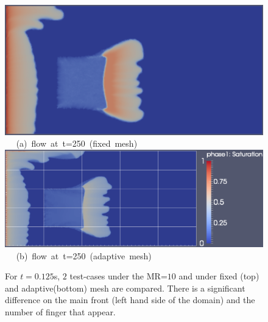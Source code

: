\begin{landscape}
\begin{figure}[ht] 
\vbox{
\hbox{\hspace{3.5cm}
\includegraphics[width=.65\textwidth]{./Pics1/mr10_5regions_fixed/5regions_fixed_250.pdf} 
}
\vspace{0.0cm}
\hbox{\hspace{6.5cm} (a) flow at t=250 (fixed mesh)  
}
\vspace{0.25cm}
\hbox{\hspace{3.5cm}
\includegraphics[width=.9\textwidth]{./Pics1/mr10_5regions_adapt/5regions_adapt_250_1.pdf}
}
\vspace{0.0cm}
\hbox{\hspace{6.5cm} (b) flow at t=250 (adaptive mesh)    
}
}     
\caption{For $t=0.125$s, $2$ test-cases under the MR=$10$ and under fixed (top) and adaptive(bottom) mesh are compared. There is a significant difference on the main front (left hand side of the domain) and the number of finger that appear.}
\label{fig:2testcase_a}
\end{figure}
\end{landscape}
\clearpage


